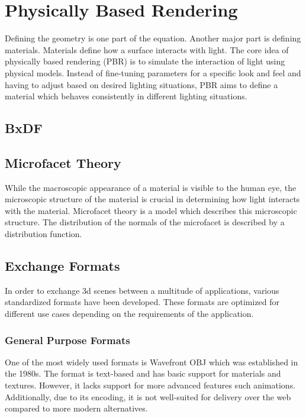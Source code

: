 \section{Physically Based Rendering}

Defining the geometry is one part of the equation. Another major part is defining materials. Materials define how a surface interacts with light. The core idea of physically based rendering (PBR) is to simulate the interaction of light using physical models. Instead of fine-tuning parameters for a specific look and feel and having to adjust based on desired lighting situations, PBR aims to define a material which behaves consistently in different lighting situations.

\subsection{BxDF}
\subsection{Microfacet Theory}

While the macroscopic appearance of a material is visible to the human eye, the microscopic structure of the material is crucial in determining how light interacts with the material. Microfacet theory is a model which describes this microscopic structure. The distribution of the normals of the microfacet is described by a distribution function.

\subsection{Exchange Formats}

In order to exchange 3d scenes between a multitude of applications, various standardized formats have been developed. These formats are optimized for different use cases depending on the requirements of the application.

\subsubsection{General Purpose Formats}

One of the most widely used formats is Wavefront OBJ which was established in the 1980s. The format is text-based and has basic support for materials and textures. However, it lacks support for more advanced features such animations. Additionally, due to its encoding, it is not well-suited for delivery over the web compared to more modern alternatives.

